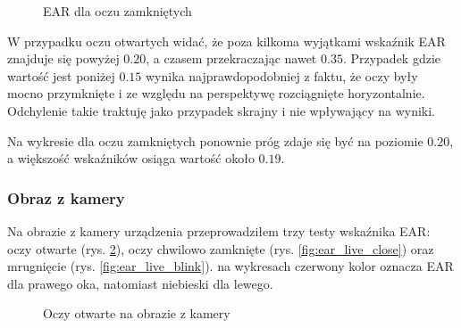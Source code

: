 \begin{figure}[!h]
    \centering
    \caption{EAR dla oczu zamkniętych}
    \label{fig:ear_static_close}
\end{figure}

W przypadku oczu otwartych widać, że poza kilkoma wyjątkami wskaźnik EAR znajduje się powyżej $0.20$, a czasem przekraczając nawet $0.35$. Przypadek gdzie wartość  jest poniżej $0.15$ wynika najprawdopodobniej z faktu, że oczy były mocno przymknięte i ze względu na perspektywę rozciągnięte horyzontalnie. Odchylenie takie traktuję jako przypadek skrajny i nie wpływający na wyniki.
\par
Na wykresie dla oczu zamkniętych ponownie próg zdaje się być na poziomie $0.20$, a większość wskaźników osiąga wartość około $0.19$. 

\subsubsection{Obraz z kamery}

Na obrazie z kamery urządzenia przeprowadziłem trzy testy wskaźnika EAR: oczy otwarte (rys. \ref{fig:ear_live_open}), oczy chwilowo zamknięte (rys. \ref{fig:ear_live_close}) oraz mrugnięcie (rys. \ref{fig:ear_live_blink}). na wykresach czerwony kolor oznacza EAR dla prawego oka, natomiast niebieski dla lewego.


\begin{figure}[!h]
    \centering
    \caption{Oczy otwarte na obrazie z kamery}
    \label{fig:ear_live_open}
\end{figure}

